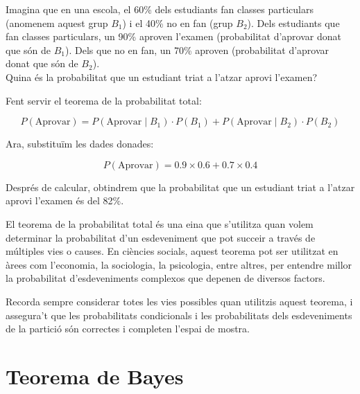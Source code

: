 \documentclass[12pt]{article}
\begin{document}
\begin{exemple} [title=Exemple 2] \noindent 
Imagina que en una escola, el 60\% dels estudiants fan classes particulars (anomenem aquest grup \(B_1\)) i el 40\% no en fan (grup \(B_2\)). Dels estudiants que fan classes particulars, un 90\% aproven l'examen (probabilitat d'aprovar donat que són de \(B_1\)). Dels que no en fan, un 70\% aproven (probabilitat d'aprovar donat que són de \(B_2\)).\\

Quina és la probabilitat que un estudiant triat a l'atzar aprovi l'examen?

Fent servir el teorema de la probabilitat total:

\[
P(\text{Aprovar}) = P(\text{Aprovar} \mid B_1) \cdot P(B_1) + P(\text{Aprovar} \mid B_2) \cdot P(B_2)
\]

Ara, substituïm les dades donades:

\[
P(\text{Aprovar}) = 0.9 \times 0.6 + 0.7 \times 0.4
\]

Després de calcular, obtindrem que la probabilitat que un estudiant triat a l'atzar aprovi l'examen és del 82\%.
\end{exemple}

\begin{concept} [title=Conclusió] \noindent
El teorema de la probabilitat total és una eina que s'utilitza quan volem determinar la probabilitat d'un esdeveniment que pot succeir a través de múltiples vies o causes. En ciències socials, aquest teorema pot ser utilitzat en àrees com l'economia, la sociologia, la psicologia, entre altres, per entendre millor la probabilitat d'esdeveniments complexos que depenen de diversos factors.

Recorda sempre considerar totes les vies possibles quan utilitzis aquest teorema, i assegura't que les probabilitats condicionals i les probabilitats dels esdeveniments de la partició són correctes i completen l'espai de mostra.
\end{concept}

\section{Teorema de Bayes}
\end{document}
